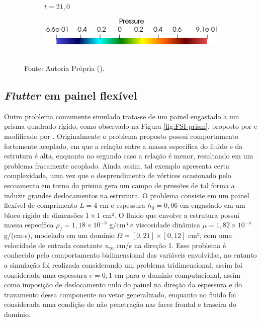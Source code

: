 \begin{figure}[h!]
\begin{subfigure}[b]{0.3\textwidth}
        \caption{$t=21,0$}
    \end{subfigure}
    \begin{subfigure}[b]{0.4\textwidth}
        \includegraphics[width=\linewidth]{Figuras/FSI-Cavity2D/legenda.png}
    \end{subfigure}
    \\Fonte: Autoria Própria (\the\year).
    \label{fig:cavity2D-time}
\end{figure}

\subsection{\textit{Flutter} em painel flexível}

Outro problema comumente simulado trata-se de um painel engastado a um prisma quadrado rígido, como observado na Figura \ref{fig:FSI-prism}, proposto por  e modificado por . Originalmente o problema proposto possui comportamento fortemente acoplado, em que a relação entre a massa específica do fluido e da estrutura é alta, enquanto no segundo caso a relação é menor, resultando em um problema fracamente acoplado. Ainda assim, tal exemplo apresenta certa complexidade, uma vez que o desprendimento de vórtices ocasionado pelo escoamento em torno do prisma gera um campo de pressões de tal forma a induzir grandes deslocamentos na estrutura. O problema consiste em um painel flexível de comprimento $L=4$ cm e espessura $h_0=0,06$ cm engastado em um bloco rígido de dimensões $1\times 1$ cm². O fluido que envolve a estrutura possui massa específica $\rho_f=1,18\times10^{-3}$ g/cm³ e viscosidade dinâmica $\mu=1,82\times10^{-4}$ g/(cm$\cdot$s), modelado em um domínio $\Omega=[0,21]\times[0,12]$ cm², com uma velocidade de entrada constante $u_\infty$ cm/s na direção 1. Esse problema é conhecido pelo comportamento bidimensional das variáveis envolvidas, no entanto a simulação foi realizada considerando um problema tridimensional, assim foi considerada uma espessura $e=0,1$ cm para o domínio computacional, assim como imposição de deslocamento nulo do painel na direção da espessura e do travamento dessa componente no vetor generalizado, enquanto no fluido foi considerada uma condição de não penetração nas faces frontal e traseira do domínio.

